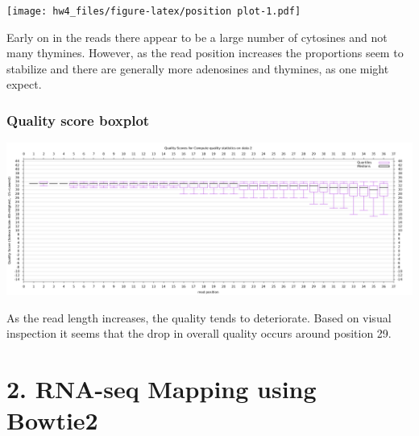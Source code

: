 \documentclass[
]{article}
\begin{document}
\texttt{[image: hw4\_files/figure-latex/position plot-1.pdf]}

Early on in the reads there appear to be a large number of cytosines and
not many thymines. However, as the read position increases the
proportions seem to stabilize and there are generally more adenosines
and thymines, as one might expect.

\hypertarget{quality-score-boxplot}{%
\subsubsection{Quality score boxplot}\label{quality-score-boxplot}}

\includegraphics{./quality_score_boxplot.png}

As the read length increases, the quality tends to deteriorate. Based on
visual inspection it seems that the drop in overall quality occurs
around position 29.

\hypertarget{rna-seq-mapping-using-bowtie2}{%
\section{2. RNA-seq Mapping using
Bowtie2}\label{rna-seq-mapping-using-bowtie2}}
\end{document}
